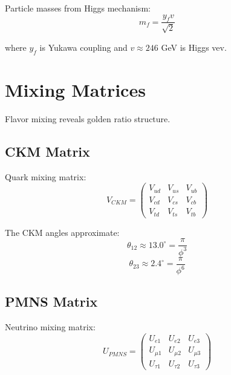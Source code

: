 \begin{proposition}
\label{fa_20:prop:higgs-mass}
Particle masses from Higgs mechanism:
\begin{equation}
m_f = \frac{y_f v}{\sqrt{2}}
\end{equation}

where $y_f$ is Yukawa coupling and $v \approx 246$ GeV is Higgs vev.
\end{proposition}

\section{Mixing Matrices}

Flavor mixing reveals golden ratio structure.

\subsection{CKM Matrix}\label{sec:ckm}

\begin{definition}
\label{fa_20:def:ckm}
Quark mixing matrix:
\begin{equation}
V_{CKM} = \begin{pmatrix}
V_{ud} & V_{us} & V_{ub} \\
V_{cd} & V_{cs} & V_{cb} \\
V_{td} & V_{ts} & V_{tb}
\end{pmatrix}
\end{equation}
\end{definition}

\begin{proposition}
\label{fa_20:prop:ckm-golden}
The CKM angles approximate:
\begin{equation}
\theta_{12} \approx 13.0^\circ = \frac{\pi}{\phi^3}
\end{equation}
\begin{equation}
\theta_{23} \approx 2.4^\circ = \frac{\pi}{\phi^6}
\end{equation}
\end{proposition}

\subsection{PMNS Matrix}

\begin{definition}
\label{fa_20:def:pmns}
Neutrino mixing matrix:
\begin{equation}
U_{PMNS} = \begin{pmatrix}
U_{e1} & U_{e2} & U_{e3} \\
U_{\mu1} & U_{\mu2} & U_{\mu3} \\
U_{\tau1} & U_{\tau2} & U_{\tau3}
\end{pmatrix}
\end{equation}
\end{definition}

